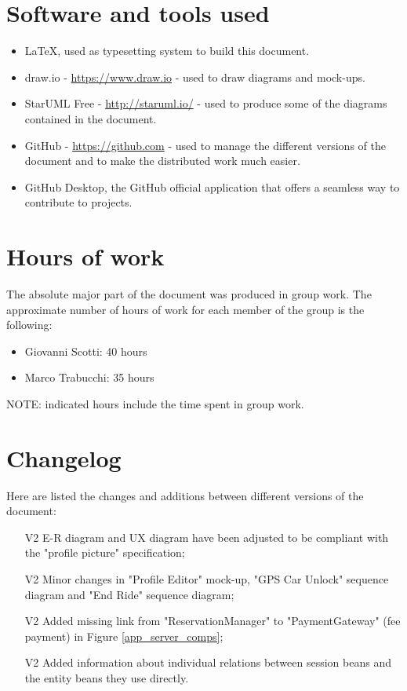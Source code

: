 \section{Software and tools used}
\begin{itemize}
\item \LaTeX, used as typesetting system to build this document.
\item draw.io - \url{https://www.draw.io} - used to draw diagrams and mock-ups.
\item StarUML Free - \url{http://staruml.io/} - used to produce some of the diagrams contained in the document.
\item GitHub - \url{https://github.com} - used to manage the different versions of the document and to make the distributed work much easier.
\item GitHub Desktop, the GitHub official application that offers a seamless way to contribute to projects.
\end{itemize}
\section{Hours of work}
The absolute major part of the document was produced in group work. The approximate number of hours of work for each member of the group is the following:

\begin{itemize}
\item Giovanni Scotti: 40 hours
\item Marco Trabucchi: 35 hours
\end{itemize}

NOTE: indicated hours include the time spent in group work.

\section{Changelog}
Here are listed the changes and additions between different versions of the document:
\begin{itemize}
\item[V2] E-R diagram and UX diagram have been adjusted to be compliant with the "profile picture" specification;
\item[V2] Minor changes in "Profile Editor" mock-up, "GPS Car Unlock" sequence diagram and "End Ride" sequence diagram;
\item[V2] Added missing link from "ReservationManager" to "PaymentGateway" (fee payment) in Figure \ref{app_server_comps};
\item[V2] Added information about individual relations between session beans and the entity beans they use directly.
\end{itemize}
